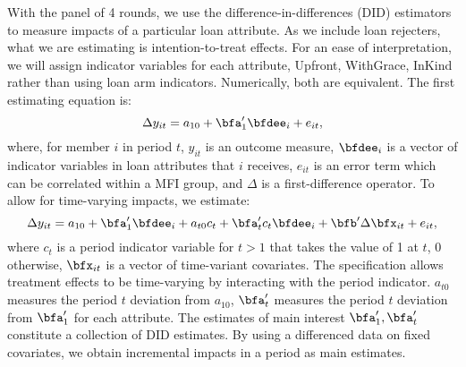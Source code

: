 	With the panel of 4 rounds, we use the difference-in-differences (DID) estimators to measure impacts of a particular loan attribute.  As we include loan rejecters, what we are estimating is intention-to-treat effects. For an ease of interpretation, we will assign indicator variables for each attribute, \textsf{Upfront, WithGrace, InKind} rather than using loan arm indicators. Numerically, both are equivalent. The first estimating equation is:
\begin{equation}
\Delta y_{it}=a_{10}+\bfa'_{1}\bfdee_{i}+e_{it},
\end{equation}
where, for member $i$ in period $t$, $y_{it}$ is an outcome measure, $\bfdee_{i}$ is a vector of indicator variables in loan attributes that $i$ receives, $e_{it}$ is an error term which can be correlated within a MFI group, and $\Delta$ is a first-difference operator. To allow for time-varying impacts, we estimate:
\begin{equation}
\Delta y_{it}=a_{10}+\bfa'_{1}\bfdee_{i}+a_{t0}c_{t}+\bfa'_{t}c_{t}\bfdee_{i}+\bfb'\Delta\bfx_{it}+e_{it},
\end{equation}
where $c_{t}$ is a period indicator variable for $t>1$ that takes the value of 1 at $t$, 0 otherwise, $\bfx_{it}$ is a vector of time-variant covariates. The specification allows treatment effects to be time-varying by interacting with the period indicator. $a_{t0}$ measures the period $t$ deviation from $a_{10}$, $\bfa'_{t}$ measures the period $t$ deviation from $\bfa'_{1}$ for each attribute. The estimates of main interest $\bfa'_{1}, \bfa'_{t}$ constitute a collection of DID estimates. By using a differenced data on fixed covariates, we obtain incremental impacts in a period as main estimates. %
